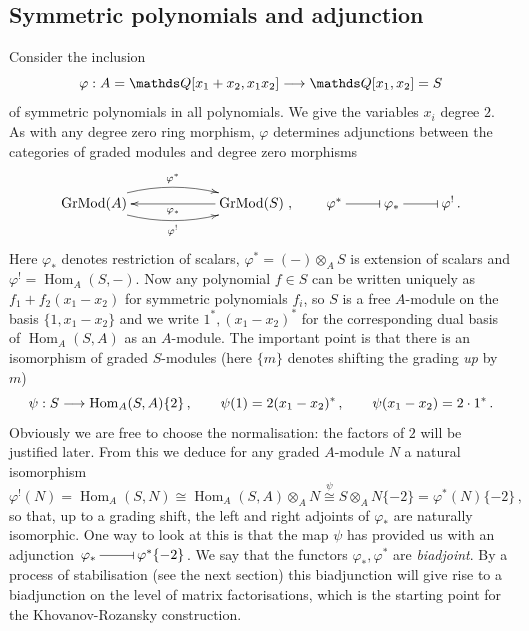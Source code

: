 \documentclass{compositio}
\theoremstyle{definition}
\numberwithin{equation}{section}
\def\Hom{\operatorname{Hom}}
\def\Grmodd{\operatorname{GrMod}}
\begin{document}
\subsection{Symmetric polynomials and adjunction}

Consider the inclusion
\[
\varphi: A = \QQ[x_1 + x_2, x_1 x_2] \lto \QQ[x_1,x_2] = S
\]
of symmetric polynomials in all polynomials. We give the variables $x_i$ degree $2$. As with any degree zero ring morphism, $\varphi$ determines adjunctions between the categories of graded modules and degree zero morphisms
\[
\xymatrix@C+3pc{
\Grmodd(A) \ar@/^1pc/[r]^-{\varphi^*} \ar@/_1pc/[r]_-{\varphi^!} & \Grmodd(S) \ar[l]^-{\varphi_*}
}, \qquad
\xymatrix{
\varphi^* \ar@{-|}[r] & \varphi_* \ar@{-|}[r] & \varphi^!\,.
}
\]
Here $\varphi_*$ denotes restriction of scalars, $\varphi^* = (-) \otimes_A S$ is extension of scalars and $\varphi^! = \Hom_A(S, -)$. Now any polynomial $f \in S$ can be written uniquely as $f_1 + f_2(x_1-x_2)$ for symmetric polynomials $f_i$, so $S$ is a free $A$-module on the basis $\{1, x_1 - x_2\}$ and we write $1^*, (x_1-x_2)^*$ for the corresponding dual basis of $\Hom_A(S,A)$ as an $A$-module. The important point is that there is an isomorphism of graded $S$-modules (here $\{ m \}$ denotes shifting the grading \emph{up} by $m$)
\[
\psi: S \lto \Hom_A(S,A)\{2\} \, , \qquad \psi(1) = 2(x_1-x_2)^* \, , \qquad \psi(x_1-x_2) = 2 \cdot 1^* \, .
\]
Obviously we are free to choose the normalisation: the factors of $2$ will be justified later. From this we deduce for any graded $A$-module $N$ a natural isomorphism 
\[
\varphi^!(N) = \Hom_A(S,N) \cong \Hom_A(S,A) \otimes_A N \stackrel{\psi}{\cong} S \otimes_A N \{-2\} = \varphi^*(N)\{-2\} \, ,
\]
so that, up to a grading shift, the left and right adjoints of $\varphi_*$ are naturally isomorphic. One way to look at this is that the map $\psi$ has provided us with an adjunction $\xymatrix@1{\varphi_*\, \ar@{-|}[r] & \,\varphi^*\{-2\}}$. We say that the functors $\varphi_*, \varphi^*$ are \emph{biadjoint}. By a process of stabilisation (see the next section) this biadjunction will give rise to a biadjunction on the level of matrix factorisations, which is the starting point for the Khovanov-Rozansky construction.
\end{document}
